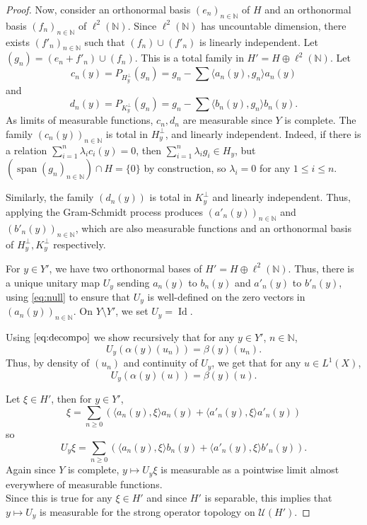 \documentclass{article}
\theoremstyle{definition}
\theoremstyle{remark}
\numberwithin{equation}{section}
\newcommand{\N}{\mathbb{N}}
\DeclareMathOperator{\vspan}{span}
\DeclareMathOperator{\Id}{Id}
\begin{document}
\begin{proof}
Now, consider an orthonormal basis $(e_n)_{n\in \N}$ of $H$ and an orthonormal basis $(f_n)_{n\in \N}$ of $\ell^2(\N)$. Since $\ell^2(\N)$ has uncountable dimension, there exists $(f'_n)_{n\in \N}$ such that $(f_n)\cup (f'_n)$ is linearly independent. Let $(g_n)=(e_n+f'_n)\cup (f_n)$. This is a total family in $H'=H\oplus \ell^2(\N)$. Let $$c_n(y)=P_{H_y^\bot}(g_n)=g_n-\sum \langle a_n(y),g_n \rangle a_n(y)$$and $$d_n(y)=P_{K_y^\bot}(g_n)=g_n-\sum \langle b_n(y),g_n \rangle b_n(y).$$As limits of measurable functions, $c_n,d_n$ are measurable since $Y$ is complete. The family $(c_n(y))_{n\in \N}$ is total in $H_y^\bot$, and linearly independent. Indeed, if there is a relation $\sum_{i=1}^n \lambda_i c_i(y)=0$, then $\sum_{i=1}^n \lambda_ig_i\in H_y$, but $\left(\vspan (g_n)_{n\in\N}\right)\cap H=\{0\}$ by construction, so $\lambda_i=0$ for any $1\leq i\leq n$.

Similarly, the family $\left(d_n(y)\right)$ is total in $K_y^\bot$ and linearly independent. Thus, applying the Gram-Schmidt process produces $\left(a'_n(y)\right)_{n\in\N}$ and $\left(b'_n(y)\right)_{n\in\N}$, which are also measurable functions and an orthonormal basis of $H_y^\bot,K_y^\bot$ respectively.\medskip

For $y\in Y'$, we have two orthonormal bases of $H'=H\oplus \ell^2(\N)$. Thus, there is a unique unitary map $U_y$ sending $a_n(y)$ to $b_n(y)$ and $a'_n(y)$ to $b'_n(y)$, using \eqref{eq:null} to ensure that $U_y$ is well-defined on the zero vectors in $\left(a_n(y)\right)_{n\in \N}$. On $Y\setminus Y'$, we set $U_y=\Id$.\smallskip

Using $\eqref{eq:decompo}$ we show recursively that for any $y\in Y'$, $n\in \N$, $$U_y(\alpha(y)(u_n))=\beta(y)(u_n).$$ Thus, by density of $(u_n)$ and continuity of $U_y$, we get that for any $u\in L^1(X)$, $$U_y(\alpha(y)(u))=\beta(y)(u).$$

Let $\xi\in H'$, then for $y\in Y'$, $$\displaystyle \xi=\sum_{n\geq 0} \left(\langle a_n(y),\xi \rangle a_n(y) + \langle a'_n(y),\xi \rangle a'_n(y)\right)$$so $$\displaystyle U_y\xi=\sum_{n\geq 0} \left(\langle a_n(y),\xi \rangle b_n(y) + \langle a'_n(y),\xi \rangle b'_n(y)\right).$$ Again since $Y$ is complete, $y\mapsto U_y\xi$ is measurable as a pointwise limit almost everywhere of measurable functions.\\
Since this is true for any $\xi\in H'$ and since $H'$ is separable, this implies that $y\mapsto U_y$ is measurable for the strong operator topology on $\mathcal{U}\left(H'\right)$.
\end{proof}
\end{document}

